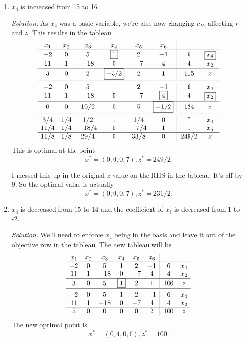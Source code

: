 \documentclass{homework}
\newcommand{\solution}{	\vspace{1em} \textit{Solution.} \quad }
\begin{document}
\begin{enumerate}
\begin{enumerate}
			\item $x_4$ is increased from 15 to 16\textonehalf.
			
				\solution As $x_4$ was a basic variable, we're also now changing $c_B$, affecting $r$ and $z$. This results in the tableau \begin{align*}
					\begin{array}{cccccc|cc}
						x_1 & x_2 & x_3 & x_4 & x_5 & x_6 & & \\
						\hline
						-2 & 0 & 5 & \boxed{1} & 2 & -1 & 6 & \boxed{x_4} \\
						11 & 1 & -18 & 0 & -7 & 4 & 4 & x_2 \\
						\hline
						3 & 0 & 2 & \boxed{-3/2} & 2 & 1 & 115 & z \\
						\midrule
						-2 & 0 & 5 & 1 & 2 & -1 & 6 & x_4 \\
						11 & 1 & -18 & 0 & -7 & \boxed{4} & 4 & \boxed{x_2} \\
						\hline
						0 & 0 & 19/2 & 0 & 5 & \boxed{-1/2} & 124 & z \\
						\midrule
						3/4 & 1/4 & 1/2 & 1 & 1/4 & 0 & 7 & x_4\\
						11/4 & 1/4 & -18/4 & 0 & -7/4 & 1 & 1 & x_6 \\
						\hline
						11/8 & 1/8 & 29/4 & 0 & 33/8 & 0 & 249/2 & z
					\end{array}
				\end{align*}
				\sout{ This is optimal at the point $$\boxed{x^* = (0, 0, 0, 7), z^* = 249/2.}$$ } 
				
				I messed this up in the original $z$ value on the RHS in the tableau. It's off by 9. So the optimal value is actually
				$$\boxed{x^* = (0, 0, 0, 7), z^* = 231/2.}$$				
			\item $x_4$ is decreased from 15 to 14 and the coefficient of $x_3$ is decreased from 1 to -2.
			

			\solution We'll need to enforce $x_4$ being in the basis and leave it out of the objective row in the tableau. The new tableau will be \begin{align*}
				\begin{array}{cccccc|cc}
					x_1 & x_2 & x_3 & x_4 & x_5 & x_6 & & \\
					\hline
					-2 & 0 & 5 & 1 & 2 & -1 & 6 & x_4 \\
					11 & 1 & -18 & 0 & -7 & 4 & 4 & x_2 \\
					\hline
					3 & 0 & 5 & \boxed{1} & 2 & 1 & 106 & z \\
					\midrule
					-2 & 0 & 5 & 1 & 2 & -1 & 6 & x_4 \\
					11 & 1 & -18 & 0 & -7 & 4 & 4 & x_2 \\					
					\hline
					5 & 0 & 0 & 0 & 0 & 2 & 100 & z
				\end{array}
			\end{align*}
			The new optimal point is $$\boxed{x^*=(0, 4, 0, 6), z^*=100.}$$
		\end{enumerate}
		

\end{enumerate}
\end{document}
